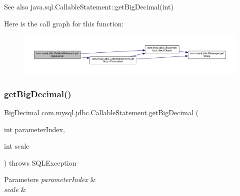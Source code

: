 \begin{DoxySeeAlso}{See also}
java.\+sql.\+Callable\+Statement\+::get\+Big\+Decimal(int) 
\end{DoxySeeAlso}
Here is the call graph for this function\+:\nopagebreak
\begin{figure}[H]
\begin{center}
\leavevmode
\includegraphics[width=350pt]{classcom_1_1mysql_1_1jdbc_1_1_callable_statement_a53f2849edb219a3cb6e37e3a0f42a064_cgraph}
\end{center}
\end{figure}
\mbox{\label{classcom_1_1mysql_1_1jdbc_1_1_callable_statement_a0880f0927e476429020989dc3dd5b9ab}} 
\subsubsection{\texorpdfstring{get\+Big\+Decimal()}{getBigDecimal()}\hspace{0.1cm}{\footnotesize\ttfamily [2/3]}}
{\footnotesize\ttfamily Big\+Decimal com.\+mysql.\+jdbc.\+Callable\+Statement.\+get\+Big\+Decimal (\begin{DoxyParamCaption}\item[{int}]{parameter\+Index,  }\item[{int}]{scale }\end{DoxyParamCaption}) throws S\+Q\+L\+Exception}


\begin{DoxyParams}{Parameters}
{\em parameter\+Index} & \\
\hline
{\em scale} & \\
\hline
\end{DoxyParams}

